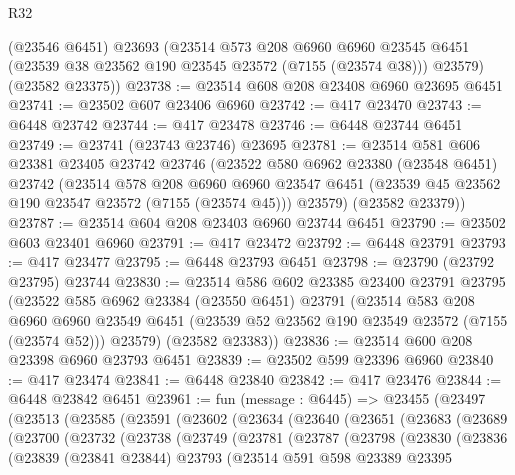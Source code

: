 \begin{lexlean}{R32}
\begin{coremodule}
      (@23546 @6451)
      @23693
      (@23514
        @573
        @208
        @6960
        @6960
        @23545
        @6451
        (@23539 @38 @23562 @190 @23545 @23572 (@7155 (@23574 @38)))
        @23579)
      (@23582 @23375))
@23738 := @23514 @608 @208 @23408 @6960 @23695 @6451
@23741 := @23502 @607 @23406 @6960
@23742 := @417 @23470
@23743 := @6448 @23742
@23744 := @417 @23478
@23746 := @6448 @23744 @6451
@23749 := @23741 (@23743 @23746) @23695
@23781 := @23514
    @581
    @606
    @23381
    @23405
    @23742
    @23746
    (@23522
      @580
      @6962
      @23380
      (@23548 @6451)
      @23742
      (@23514
        @578
        @208
        @6960
        @6960
        @23547
        @6451
        (@23539 @45 @23562 @190 @23547 @23572 (@7155 (@23574 @45)))
        @23579)
      (@23582 @23379))
@23787 := @23514 @604 @208 @23403 @6960 @23744 @6451
@23790 := @23502 @603 @23401 @6960
@23791 := @417 @23472
@23792 := @6448 @23791
@23793 := @417 @23477
@23795 := @6448 @23793 @6451
@23798 := @23790 (@23792 @23795) @23744
@23830 := @23514
    @586
    @602
    @23385
    @23400
    @23791
    @23795
    (@23522
      @585
      @6962
      @23384
      (@23550 @6451)
      @23791
      (@23514
        @583
        @208
        @6960
        @6960
        @23549
        @6451
        (@23539 @52 @23562 @190 @23549 @23572 (@7155 (@23574 @52)))
        @23579)
      (@23582 @23383))
@23836 := @23514 @600 @208 @23398 @6960 @23793 @6451
@23839 := @23502 @599 @23396 @6960
@23840 := @417 @23474
@23841 := @6448 @23840
@23842 := @417 @23476
@23844 := @6448 @23842 @6451
@23961 := fun (message : @6445) =>
  @23455
    (@23497
      (@23513
        (@23585
          (@23591
            (@23602
              (@23634
                (@23640
                  (@23651
                    (@23683
                      (@23689
                        (@23700
                          (@23732
                            (@23738
                              (@23749
                                (@23781
                                  (@23787
                                    (@23798
                                      (@23830
                                        (@23836
                                          (@23839
                                            (@23841 @23844)
                                            @23793
                                            (@23514
                                              @591
                                              @598
                                              @23389
                                              @23395

\end{coremodule}
\end{lexlean}
